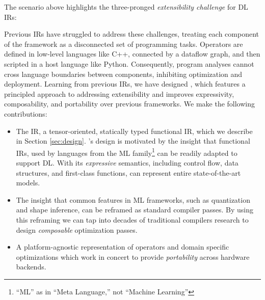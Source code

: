The scenario above highlights the three-pronged \textit{extensibility challenge}
  for DL IRs:

Previous IRs have struggled to address these challenges, treating each
  component of the framework as a disconnected set of programming tasks.
Operators are defined in low-level languages like C++,
  connected by a dataflow graph, and then scripted
  in a host language like Python.
Consequently,
  program analyses cannot cross language boundaries between components,
  inhibiting optimization and deployment.
Learning from previous IRs, we have designed \relay,
  which features a principled approach to addressing extensibility
  and improves expressivity, composability, and portability
  over previous frameworks.
We make the following contributions:
\begin{itemize}
  \item The \relay IR, a tensor-oriented, statically typed
    functional IR,
    which we describe in Section \ref{sec:design}.
  \relay's design is motivated by the insight that functional IRs, used by
  languages from the ML family\footnote{``ML'' as in ``Meta Language,'' not
  ``Machine Learning''} can be readily adapted to support DL.
  With its \textit{expressive} semantics,
    including control flow, data structures, and first-class functions,
    \relay can represent entire state-of-the-art models.
  \item The insight that common features in ML frameworks,
    such as quantization and shape inference,
    can be reframed as standard compiler passes.
  By using this reframing we can tap into
    decades of traditional compilers research to design
    \textit{composable} optimization passes.
  \item
    A platform-agnostic representation of operators and domain specific
      optimizations which work in concert to provide \textit{portability}
      across hardware backends.
\end{itemize}

